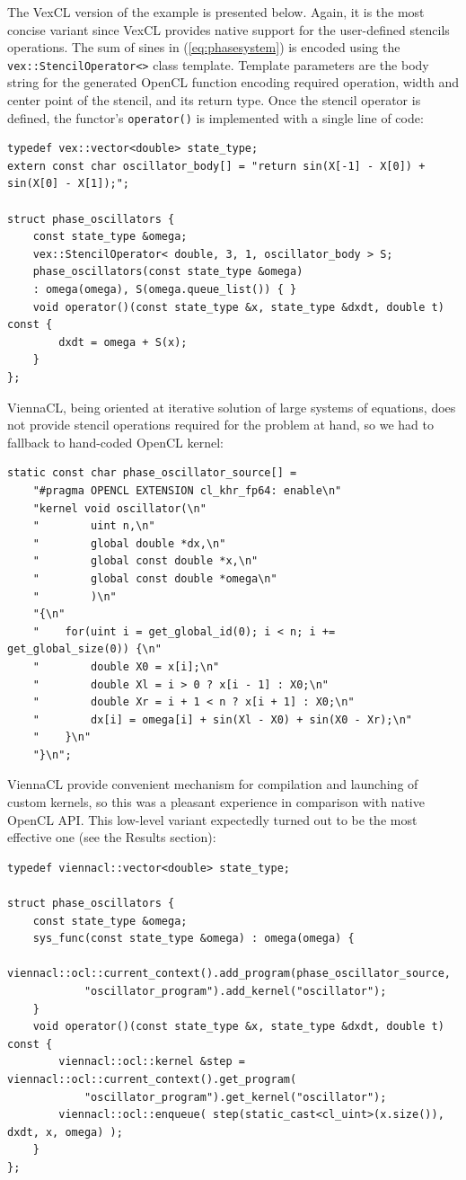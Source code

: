 \documentclass[final]{siamltex}
\newcommand{\code}[1]{\lstinline|#1|}
\newcommand{\eqref}[1]{(\ref{#1})}
\begin{document}
The VexCL version of the example is presented below.  Again, it is the most
concise variant since VexCL provides native support for the user-defined
stencils operations. The sum of sines in \eqref{eq:phasesystem} is encoded
using the \code{vex::StencilOperator<>} class template.  Template parameters
are the body string for the generated OpenCL function encoding required
operation, width and center point of the stencil, and its return type. Once the
stencil operator is defined, the functor's \code{operator()} is implemented
with a single line of code:
\begin{lstlisting}
typedef vex::vector<double> state_type;
extern const char oscillator_body[] = "return sin(X[-1] - X[0]) + sin(X[0] - X[1]);";

struct phase_oscillators {
    const state_type &omega;
    vex::StencilOperator< double, 3, 1, oscillator_body > S;
    phase_oscillators(const state_type &omega)
	: omega(omega), S(omega.queue_list()) { }
    void operator()(const state_type &x, state_type &dxdt, double t) const {
        dxdt = omega + S(x);
    }
};
\end{lstlisting}


ViennaCL, being oriented at iterative solution of large systems of equations,
does not provide stencil operations required for the problem at hand, so we had
to fallback to hand-coded OpenCL kernel:
\begin{lstlisting}
static const char phase_oscillator_source[] =
    "#pragma OPENCL EXTENSION cl_khr_fp64: enable\n"
    "kernel void oscillator(\n"
    "        uint n,\n"
    "        global double *dx,\n"
    "        global const double *x,\n"
    "        global const double *omega\n"
    "        )\n"
    "{\n"
    "    for(uint i = get_global_id(0); i < n; i += get_global_size(0)) {\n"
    "        double X0 = x[i];\n"
    "        double Xl = i > 0 ? x[i - 1] : X0;\n"
    "        double Xr = i + 1 < n ? x[i + 1] : X0;\n"
    "        dx[i] = omega[i] + sin(Xl - X0) + sin(X0 - Xr);\n"
    "    }\n"
    "}\n";
\end{lstlisting}
ViennaCL provide convenient mechanism for compilation and launching of custom
kernels, so this was a pleasant experience in comparison with native OpenCL
API. This low-level variant expectedly turned out to be the most effective one
(see the Results section):
\begin{lstlisting}[firstnumber=last]
typedef viennacl::vector<double> state_type;

struct phase_oscillators {
    const state_type &omega;
    sys_func(const state_type &omega) : omega(omega) {
        viennacl::ocl::current_context().add_program(phase_oscillator_source,
            "oscillator_program").add_kernel("oscillator");
    }
    void operator()(const state_type &x, state_type &dxdt, double t) const {
        viennacl::ocl::kernel &step = viennacl::ocl::current_context().get_program(
            "oscillator_program").get_kernel("oscillator");
        viennacl::ocl::enqueue( step(static_cast<cl_uint>(x.size()), dxdt, x, omega) );
    }
};
\end{lstlisting}
\end{document}
